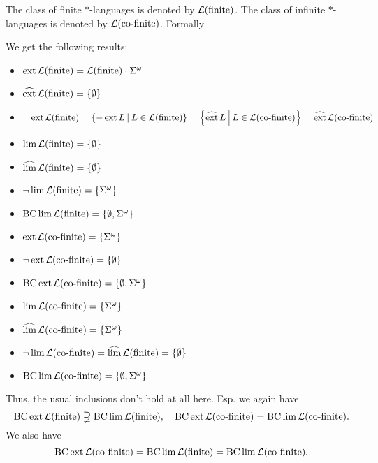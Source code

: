 The class of finite $*$-languages is denoted by $\mathcal{L}(\textup{\textrm{finite}})$. The class of infinite $*$-languages is denoted by $\mathcal{L}(\textup{\textrm{co-finite}})$. Formally

We get the following results:
\begin{itemize}
\item $\operatorname{ext} \mathcal{L}(\textup{\textrm{finite}}) = \mathcal{L}(\textup{\textrm{finite}}) \cdot \Sigma^\omega$
\item $\dext \Lang(\mathtext{finite}) = \Set{\emptyset}$
\item $\neg\ext \Lang(\mathtext{finite}) = \Set{-\ext L}{L \in \Lang(\mathtext{finite})} = \Set{\dext L}{L \in \Lang(\mathtext{co-finite})} = \dext \Lang(\mathtext{co-finite})$
\item $\lim \Lang(\mathtext{finite}) = \Set{\emptyset}$
\item $\dlim \Lang(\mathtext{finite}) = \Set{\emptyset}$
\item $\neg\lim \Lang(\mathtext{finite}) = \Set{\Sigma^\omega}$
\item $\BC \lim \Lang(\mathtext{finite}) = \Set{\emptyset,\Sigma^\omega}$
\item $\ext \Lang(\mathtext{co-finite}) = \Set{\Sigma^\omega}$
\item $\neg\ext \Lang(\mathtext{co-finite}) = \Set{\emptyset}$
\item $\BC \ext \Lang(\mathtext{co-finite}) = \Set{\emptyset,\Sigma^\omega}$
\item $\lim \Lang(\mathtext{co-finite}) = \Set{\Sigma^\omega}$
\item $\dlim \Lang(\mathtext{co-finite}) = \Set{\Sigma^\omega}$
\item $\neg\lim \Lang(\mathtext{co-finite}) = \dlim \Lang(\mathtext{finite}) = \Set{\emptyset}$
\item $\BC \lim \Lang(\mathtext{co-finite}) = \Set{\emptyset, \Sigma^\omega}$
\end{itemize}

Thus, the usual inclusions don't hold at all here. Esp. we again have
\[ \BC \ext \Lang(\mathtext{finite}) \supsetneqq \BC \lim \Lang(\mathtext{finite}) , \ \ \ 
\BC \ext \Lang(\mathtext{co-finite}) = \BC \lim \Lang(\mathtext{co-finite}) . \]
We also have
\[ \operatorname{BC} \operatorname{ext} \mathcal{L}(\textup{\textrm{co-finite}}) =
\operatorname{BC} \lim \mathcal{L}(\textup{\textrm{finite}}) = \operatorname{BC} \lim \mathcal{L}(\textup{\textrm{co-finite}}) . \]


